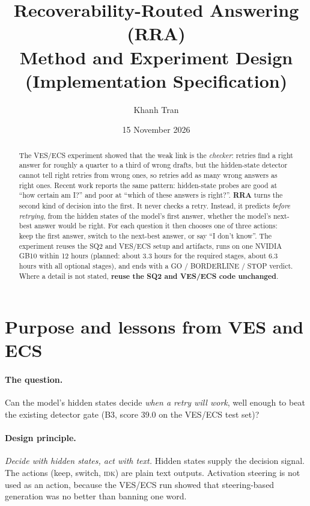 \documentclass[11pt]{article}
\title{Recoverability-Routed Answering (RRA)\\[2pt]
\large Method and Experiment Design (Implementation Specification)}
\author{Khanh Tran}
\date{15 November 2026}
\newcommand{\IDK}{\textsc{idk}}
\begin{document}
\maketitle

\begin{abstract}
\noindent
The VES/ECS experiment showed that the weak link is the \emph{checker}: retries find a right answer for
roughly a quarter to a third of wrong drafts, but the hidden-state detector cannot tell right retries from wrong
ones, so retries add as many wrong answers as right ones. Recent work reports the same pattern: hidden-state
probes are good at ``how certain am I?'' and poor at ``which of these answers is right?''.
\textbf{RRA} turns the second kind of decision into the first. It never checks a retry. Instead, it predicts
\emph{before retrying}, from the hidden states of the model's first answer, whether the model's next-best
answer would be right. For each question it then chooses one of three actions: keep the first answer, switch to
the next-best answer, or say ``I don't know''. The experiment reuses the SQ2 and VES/ECS setup and artifacts,
runs on one NVIDIA GB10 within 12 hours (planned: about 3.3 hours for the required stages, about 6.3 hours
with all optional stages), and ends with a
GO / BORDERLINE / STOP verdict. Where a detail is not stated, \textbf{reuse the SQ2 and VES/ECS code unchanged}.
\end{abstract}

\section{Purpose and lessons from VES and ECS}

\paragraph{The question.} Can the model's hidden states decide \emph{when a retry will work}, well enough to
beat the existing detector gate (B3, score 39.0 on the VES/ECS test set)?

\paragraph{Design principle.} \emph{Decide with hidden states, act with text.} Hidden states supply the decision
signal. The actions (keep, switch, \IDK) are plain text outputs. Activation steering is not used as an action,
because the VES/ECS run showed that steering-based generation was no better than banning one word.
\end{document}
